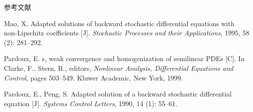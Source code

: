 \documentclass[xcolor=svgnames,serif,table,10pt]{beamer}
\begin{document}
\begin{frame}[allowframebreaks]{参考文献}
\begin{thebibliography}{57}
Mao, X.
\newblock Adapted solutions of backward stochastic differential equations with
  non-{L}ipschitz coefficients [J].
\newblock \emph{Stochastic Processes and their Applications}, 1995, 58
  (2): 281--292.

Pardoux, E.
s, weak convergence and homogenization of semilinear
  {PDE}s [C].
\newblock In Clarke, F., Stern, R., editors, \emph{Nonlinear Analysis,
  Differential Equations and Control}, pages 503--549. Kluwer Academic, New
  York, 1999.

Pardoux, E., Peng, S.
\newblock Adapted solution of a backward stochastic differential equation [J].
\newblock \emph{Systems Control Letters}, 1990, 14 (1):
  55--61.









\end{thebibliography}
\end{frame}
\end{document}
